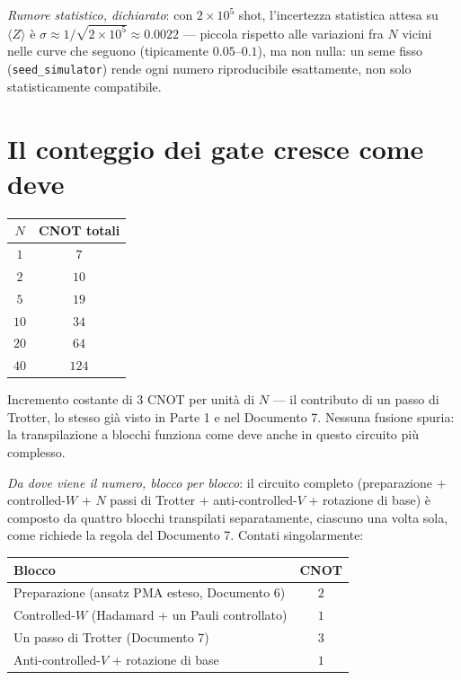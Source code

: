 \documentclass[11pt,a4paper]{article}
\begin{document}
\noindent\textit{Rumore statistico, dichiarato}: con $2\times10^5$ shot,
l'incertezza statistica attesa su $\langle Z\rangle$ è
$\sigma\approx1/\sqrt{2\times10^5}\approx0.0022$ --- piccola rispetto alle
variazioni fra $N$ vicini nelle curve che seguono (tipicamente
$0.05$--$0.1$), ma non nulla: un seme fisso (\texttt{seed\_simulator})
rende ogni numero riproducibile esattamente, non solo statisticamente
compatibile.

\section{Il conteggio dei gate cresce come deve}

\begin{center}
\renewcommand{\arraystretch}{1.2}
\begin{tabular}{@{}cc@{}}
\toprule
$N$ & CNOT totali\\
\midrule
$1$ & $7$\\
$2$ & $10$\\
$5$ & $19$\\
$10$ & $34$\\
$20$ & $64$\\
$40$ & $124$\\
\bottomrule
\end{tabular}
\end{center}

Incremento costante di 3 CNOT per unità di $N$ --- il contributo di un passo
di Trotter, lo stesso già visto in Parte 1 e nel Documento 7. Nessuna fusione
spuria: la transpilazione a blocchi funziona come deve anche in questo
circuito più complesso.

\noindent\textit{Da dove viene il numero, blocco per blocco}: il circuito
completo (preparazione + controlled-$W$ + $N$ passi di Trotter +
anti-controlled-$V$ + rotazione di base) è composto da quattro blocchi
transpilati separatamente, ciascuno una volta sola, come richiede la regola
del Documento 7. Contati singolarmente:

\begin{center}
\renewcommand{\arraystretch}{1.2}
\begin{tabular}{@{}lc@{}}
\toprule
Blocco & CNOT\\
\midrule
Preparazione (ansatz PMA esteso, Documento 6) & $2$\\
Controlled-$W$ (Hadamard + un Pauli controllato) & $1$\\
Un passo di Trotter (Documento 7) & $3$\\
Anti-controlled-$V$ + rotazione di base & $1$\\
\bottomrule
\end{tabular}
\end{center}
\end{document}
